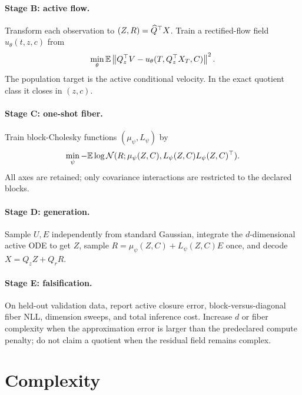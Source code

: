 \paragraph{Stage B: active flow.}
Transform each observation to $(Z,R)=\widehat Q^\top X$.  Train a rectified-flow field $u_\theta(t,z,c)$ from
\begin{equation}
 \min_\theta\mathbb E\left\lVert Q_z^\top V-u_\theta(T,Q_z^\top X_T,C)\right\rVert^2.
 \label{eq:active-loss}
\end{equation}
The population target is the active conditional velocity.  In the exact quotient class it closes in $(z,c)$.

\paragraph{Stage C: one-shot fiber.}
Train block-Cholesky functions $(\mu_\psi,L_\psi)$ by
\begin{equation}
 \min_\psi -\mathbb E\log\mathcal N(R;\mu_\psi(Z,C),L_\psi(Z,C)L_\psi(Z,C)^\top).
 \label{eq:fiber-loss}
\end{equation}
All axes are retained; only covariance interactions are restricted to the declared blocks.

\paragraph{Stage D: generation.}
Sample $U,E$ independently from standard Gaussian, integrate the $d$-dimensional active ODE to get $Z$, sample $R=\mu_\psi(Z,C)+L_\psi(Z,C)E$ once, and decode $X=Q_zZ+Q_rR$.

\paragraph{Stage E: falsification.}
On held-out validation data, report active closure error, block-versus-diagonal fiber NLL, dimension sweeps, and total inference cost.  Increase $d$ or fiber complexity when the approximation error is larger than the predeclared compute penalty; do not claim a quotient when the residual field remains complex.

\section{Complexity}

